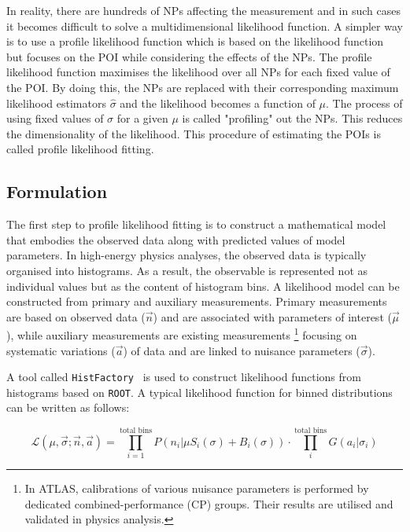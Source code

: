 In reality, there are hundreds of NPs affecting the measurement and in such cases it becomes difficult to
solve a multidimensional likelihood function. A simpler way is to use a profile likelihood function
which is based on the likelihood function but focuses on the POI while considering the effects of
the NPs. The profile likelihood function maximises the likelihood over all NPs for each fixed value 
of the POI. By doing this, the NPs are replaced with their corresponding maximum likelihood
estimators $\hat{\sigma}$ and the likelihood becomes a function of $\mu$. The process of 
using fixed values of $\sigma$ for a given $\mu$ is called "profiling" out the NPs. This reduces 
the dimensionality of the likelihood. This procedure of estimating the POIs is called profile likelihood fitting.

\subsection*{Formulation}

The first step to profile likelihood fitting is to construct a mathematical
model that embodies the observed data along with predicted 
values of model parameters. In high-energy physics analyses, the observed data is 
typically organised into histograms. As a result, the observable 
is represented not as individual values but as the content of 
histogram bins. A likelihood model can be constructed
from primary and auxiliary measurements. Primary measurements are 
based on observed data ($\vec{n}$) and are associated with parameters of interest ($\vec{\mu}$), 
while auxiliary measurements are existing measurements \footnote{In ATLAS, calibrations of various nuisance parameters is performed
by dedicated combined-performance (CP) groups. Their results are utilised and validated in physics analysis.} 
focusing on systematic variations ($\vec{a}$) of data 
and are linked to nuisance parameters ($\vec{\sigma}$). 

A tool called \texttt{HistFactory}~\cite{Cranmer:1456844} is used to construct likelihood functions
from histograms based on \texttt{ROOT}. A typical likelihood function for binned 
distributions can be written as follows:

\begin{equation}
    \mathcal{L}(\mu,\vec{\sigma} ; \vec{n},\vec{a}) = \prod_{i=1}^{\text{total bins}} P(n_i|\mu S_i(\sigma)+B_i(\sigma)) \cdot \prod_{i}^{\text{total bins}} G(a_i|\sigma_i)
\end{equation}

